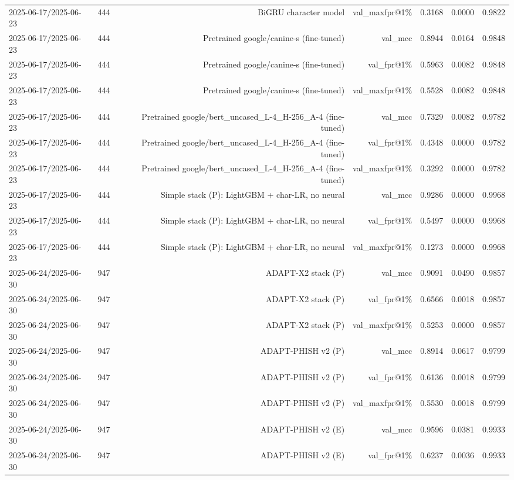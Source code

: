 \begin{table}[t]
\begin{tabular}{llrrrrr}
2025-06-17/2025-06-23 & 444 & BiGRU character model & val\_maxfpr@1\% & 0.3168 & 0.0000 & 0.9822 \\
2025-06-17/2025-06-23 & 444 & Pretrained google/canine-s (fine-tuned) & val\_mcc & 0.8944 & 0.0164 & 0.9848 \\
2025-06-17/2025-06-23 & 444 & Pretrained google/canine-s (fine-tuned) & val\_fpr@1\% & 0.5963 & 0.0082 & 0.9848 \\
2025-06-17/2025-06-23 & 444 & Pretrained google/canine-s (fine-tuned) & val\_maxfpr@1\% & 0.5528 & 0.0082 & 0.9848 \\
2025-06-17/2025-06-23 & 444 & Pretrained google/bert\_uncased\_L-4\_H-256\_A-4 (fine-tuned) & val\_mcc & 0.7329 & 0.0082 & 0.9782 \\
2025-06-17/2025-06-23 & 444 & Pretrained google/bert\_uncased\_L-4\_H-256\_A-4 (fine-tuned) & val\_fpr@1\% & 0.4348 & 0.0000 & 0.9782 \\
2025-06-17/2025-06-23 & 444 & Pretrained google/bert\_uncased\_L-4\_H-256\_A-4 (fine-tuned) & val\_maxfpr@1\% & 0.3292 & 0.0000 & 0.9782 \\
2025-06-17/2025-06-23 & 444 & Simple stack (P): LightGBM + char-LR, no neural & val\_mcc & 0.9286 & 0.0000 & 0.9968 \\
2025-06-17/2025-06-23 & 444 & Simple stack (P): LightGBM + char-LR, no neural & val\_fpr@1\% & 0.5497 & 0.0000 & 0.9968 \\
2025-06-17/2025-06-23 & 444 & Simple stack (P): LightGBM + char-LR, no neural & val\_maxfpr@1\% & 0.1273 & 0.0000 & 0.9968 \\
2025-06-24/2025-06-30 & 947 & ADAPT-X2 stack (P) & val\_mcc & 0.9091 & 0.0490 & 0.9857 \\
2025-06-24/2025-06-30 & 947 & ADAPT-X2 stack (P) & val\_fpr@1\% & 0.6566 & 0.0018 & 0.9857 \\
2025-06-24/2025-06-30 & 947 & ADAPT-X2 stack (P) & val\_maxfpr@1\% & 0.5253 & 0.0000 & 0.9857 \\
2025-06-24/2025-06-30 & 947 & ADAPT-PHISH v2 (P) & val\_mcc & 0.8914 & 0.0617 & 0.9799 \\
2025-06-24/2025-06-30 & 947 & ADAPT-PHISH v2 (P) & val\_fpr@1\% & 0.6136 & 0.0018 & 0.9799 \\
2025-06-24/2025-06-30 & 947 & ADAPT-PHISH v2 (P) & val\_maxfpr@1\% & 0.5530 & 0.0018 & 0.9799 \\
2025-06-24/2025-06-30 & 947 & ADAPT-PHISH v2 (E) & val\_mcc & 0.9596 & 0.0381 & 0.9933 \\
2025-06-24/2025-06-30 & 947 & ADAPT-PHISH v2 (E) & val\_fpr@1\% & 0.6237 & 0.0036 & 0.9933 \\

\end{tabular}
\end{table}
